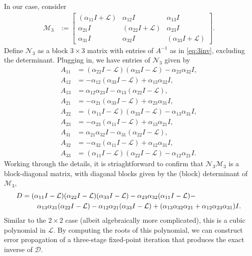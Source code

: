 \documentclass[a4paper,10pt]{article}
\begin{document}
In our case, consider 
%
\begin{align}\label{eq:Mnt}
\mathcal{M}_3 &:= \begin{bmatrix} (\alpha_{11} I + \mathcal{L}) & \alpha_{12}I & \alpha_{13}I \\
    \alpha_{21}I & (\alpha_{22}I + \mathcal{L}) & \alpha_{23} I \\
    \alpha_{31}I & \alpha_{32}I & (\alpha_{33} I + \mathcal{L}) \end{bmatrix}.
\end{align}
%
Define $\mathcal{N}_3$ as a block $3\times 3$ matrix with entries of $A^{-1}$ as in \eqref{eq:3inv},
excluding the determinant. Plugging in, we have entries of $\mathcal{N}_3$ given by
%
\begin{align*}
A_{11} &=  (\alpha_{22}I - \mathcal{L})(\alpha_{33} I - \mathcal{L}) - \alpha_{23}\alpha_{32}I, \\
    A_{12} &= -\alpha_{12}(\alpha_{33} I - \mathcal{L}) + \alpha_{13}\alpha_{32}I, \\
    A_{13} &=  \alpha_{12}\alpha_{23} I - \alpha_{13}(\alpha_{22}I - \mathcal{L}), \\
A_{21} &= -\alpha_{21}(\alpha_{33} I - \mathcal{L}) + \alpha_{23} \alpha_{31}I, \\
    A_{22} &=  (\alpha_{11} I - \mathcal{L})(\alpha_{33} I - \mathcal{L}) - \alpha_{13}\alpha_{31}I, \\
    A_{23} &= -\alpha_{23}(\alpha_{11} I - \mathcal{L}) + \alpha_{13}\alpha_{21}I, \\
A_{31} &=  \alpha_{21}\alpha_{32}I - \alpha_{31}(\alpha_{22}I - \mathcal{L}), \\
    A_{32} &= -\alpha_{32}(\alpha_{11} I - \mathcal{L}) + \alpha_{12}\alpha_{31}I, \\
    A_{33} &=  (\alpha_{11} I - \mathcal{L})(\alpha_{22}I - \mathcal{L}) - \alpha_{12}\alpha_{21}I.
\end{align*}
%
Working through the details, it is striaghtforward to confirm that $\mathcal{N}_3\mathcal{M}_3$
is a block-diagonal matrix, with diagonal blocks given by the (block) determinant of $\mathcal{M}_3$,
%
\begin{align} \label{eq:det}
\begin{split}
D & = (\alpha_{11}I - \mathcal{L}) (\alpha_{22}I - \mathcal{L})(\alpha_{33} I - \mathcal{L}) -
	\alpha_{23}\alpha_{32}(\alpha_{11}I - \mathcal{L}) - \\
& \hspace{5ex} 
	\alpha_{13}\alpha_{31}(\alpha_{22}I - \mathcal{L}) -
	\alpha_{12}\alpha_{21}(\alpha_{33}I - \mathcal{L}) + (\alpha_{13}\alpha_{32}\alpha_{21} + \alpha_{12}\alpha_{23}\alpha_{31})I.
\end{split}
\end{align}
%
Similar to the $2\times 2$ case (albeit algebraically more complicated), this is a cubic polynomial in
$\mathcal{L}$. By computing the roots of this polynomial, we can construct error propagation of a
three-stage fixed-point iteration that produces the exact inverse of $\mathcal{D}$. 
\end{document}
